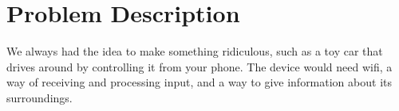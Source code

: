 \section{Problem Description}
\par
We always had the idea to make something ridiculous, such as a toy car that drives around by controlling it from your phone. The device would need wifi, a way of receiving and processing input, and a way to give information about its surroundings.
